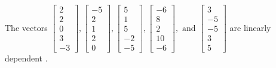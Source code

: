 \begin{exercise}
\begin{exerciseStatement}
  \end{exerciseStatement}
  \begin{exerciseAnswer}
   The vectors \(\left[\begin{array}{r}
2 \\
2 \\
0 \\
3 \\
-3
\end{array}\right] , \left[\begin{array}{r}
-5 \\
2 \\
1 \\
2 \\
0
\end{array}\right] , \left[\begin{array}{r}
5 \\
1 \\
5 \\
-2 \\
-5
\end{array}\right] , \left[\begin{array}{r}
-6 \\
8 \\
2 \\
10 \\
-6
\end{array}\right] , \text{ and } \left[\begin{array}{r}
3 \\
-5 \\
-5 \\
3 \\
5
\end{array}\right]\) are 
  	 linearly dependent  .
  


  \end{exerciseAnswer}
\end{exercise}